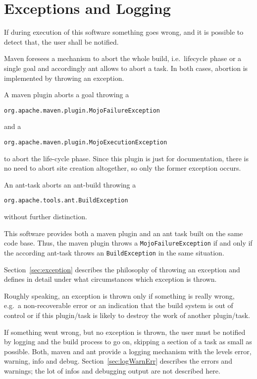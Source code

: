 \chapter{Exceptions and Logging}\label{chap:exceptionLogging}

If during execution of this software something goes wrong, 
and it is possible to detect that, the user shall be notified. 

Maven foresees a mechanism to abort the whole build, i.e.~lifecycle phase 
or a single goal and accordingly ant allows to abort a task. 
In both cases, abortion is implemented by throwing an exception. 


A maven plugin aborts a goal throwing a 
%
\begin{verbatim}
org.apache.maven.plugin.MojoFailureException
\end{verbatim}
%
and a 
%
\begin{verbatim}
org.apache.maven.plugin.MojoExecutionException 
\end{verbatim}
%
to abort the life-cycle phase. 
Since this plugin is just for documentation, 
there is no need to abort site creation altogether, 
so only the former exception occurs. 

An ant-task aborts an ant-build throwing a
%
\begin{verbatim}
org.apache.tools.ant.BuildException
\end{verbatim}
%
without further distinction. 

This software provides both a maven plugin and an ant task 
built on the same code base. 
Thus, the maven plugin throws a \texttt{MojoFailureException} 
if and only if the according ant-task throws an \texttt{BuildException} 
in the same situation. 

Section~\ref{sec:exception} describes 
the philosophy of throwing an exception and 
defines in detail under what circumstances which exception is thrown. 

Roughly speaking, an exception is thrown only if something is really wrong, 
e.g.~a non-recoverable error or an indication 
that the build system is out of control or if this plugin/task 
is likely to destroy the work of another plugin/task. 

If something went wrong, but no exception is thrown, 
the user must be notified by logging 
and the build process to go on, 
skipping a section of a task as small as possible. 
Both, maven and ant provide a logging mechanism 
with the levels error, warning, info and debug. 
Section~\ref{sec:logWarnErr} describes the errors and warnings; 
the lot of infos and debugging output are not described here. 

